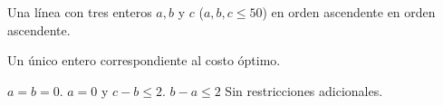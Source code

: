 \documentclass{oci}
\begin{document}
\begin{inputDescription}
  Una línea con tres enteros $a, b$ y $c$ ($a,b,c\leq 50$) en orden ascendente
  en orden ascendente.
\end{inputDescription}

\begin{outputDescription}
  Un único entero correspondiente al costo óptimo.
\end{outputDescription}

\begin{scoreDescription}
   $a = b = 0$.
   $a = 0$ y $c - b \leq 2$.
   $b - a \leq 2$
   Sin restricciones adicionales.
\end{scoreDescription}

\begin{sampleDescription}
\end{sampleDescription}
\end{document}
